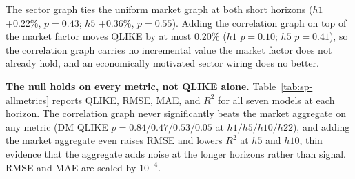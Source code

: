 \documentclass{llncs}
\begin{document}
The sector graph ties the uniform market graph at both short horizons ($h1$ $+0.22\%$, $p=0.43$; $h5$ $+0.36\%$, $p=0.55$).
Adding the correlation graph on top of the market factor moves QLIKE by at most 0.20\% ($h1$ $p=0.10$; $h5$ $p=0.41$), so
the correlation graph carries no incremental value the market factor does not already hold, and an economically
motivated sector wiring does no better.

\textbf{The null holds on every metric, not QLIKE alone.} Table~\ref{tab:sp-allmetrics} reports QLIKE, RMSE, MAE, and $R^2$ for all seven
models at each horizon. The correlation graph never significantly beats the market aggregate on any metric (DM
QLIKE $p=0.84/0.47/0.53/0.05$ at $h1/h5/h10/h22$), and adding the market aggregate even raises RMSE and lowers $R^2$
at $h5$ and $h10$, thin evidence that the aggregate adds noise at the longer horizons rather than signal. RMSE and
MAE are scaled by $10^{-4}$.
\end{document}
